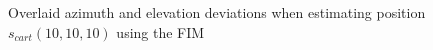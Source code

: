 \begin{figure}[!htbp]
	\captionsetup{justification=centering,margin=2cm}
	\caption{Overlaid azimuth and elevation deviations when estimating position $s_{cart}(10,10,10)$ using the FIM}
	\label{fig:both-101010-fim}
\end{figure}

